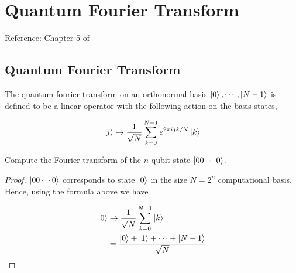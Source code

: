 \documentclass[main.tex]{subfiles}
\begin{document}
%
%
%
%
%
%
%
%
\section{Quantum Fourier Transform}
Reference: Chapter 5 of \cite{nielsen2010quantum}

\subsection{Quantum Fourier Transform}

The quantum fourier transform on an orthonormal basis $\ket{0}, \cdots ,\ket{N - 1}$ is defined to be a linear operator with the following action on the basis states,

\begin{align*}
\ket{j} \rightarrow \frac{1}{\sqrt{N}} \sum_{k=0}^{N-1} e^{2\pi i jk / N} \ket{k}
\end{align*}


\begin{example} Compute the Fourier transform of the $n$ qubit state $\ket{00\cdots 0}$.
\begin{proof}
	$\ket{00 \cdots 0 }$ corresponds to state $\ket{0}$ in the size $N = 2^n$ computational basis. Hence, using the formula above we have

	\begin{align*}
	\ket{0} &\rightarrow \frac{1}{\sqrt{N}} \sum_{k=0}^{N-1} \ket{k} \\
	&= 	\frac{\ket{0} + \ket{1} + \cdots + \ket{N-1}}{\sqrt{N}}
	\end{align*}

\end{proof}
\end{example}
\end{document}
